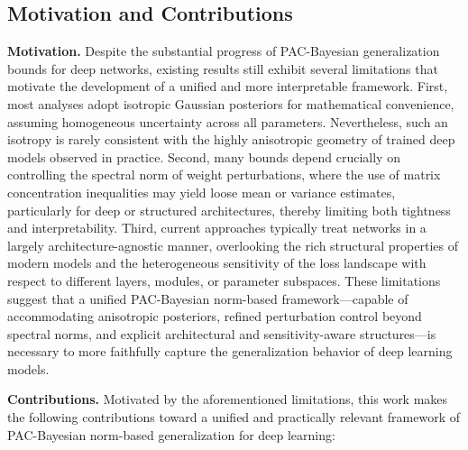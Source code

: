 \documentclass[journal]{IEEEtran} %
\begin{document}
\subsection{Motivation and Contributions}
\textbf{Motivation.}
Despite the substantial progress of PAC-Bayesian generalization bounds for deep networks, existing results still exhibit several limitations that motivate the development of a unified and more interpretable framework. First, most analyses adopt isotropic Gaussian posteriors for mathematical convenience, assuming homogeneous uncertainty across all parameters. Nevertheless, such an isotropy is rarely consistent with the highly anisotropic geometry of trained deep models observed in practice. Second, many bounds depend crucially on controlling the spectral norm of weight perturbations, where the use of matrix concentration inequalities may yield loose mean or variance estimates, particularly for deep or structured architectures, thereby limiting both tightness and interpretability. Third, current approaches typically treat networks in a largely architecture-agnostic manner, overlooking the rich structural properties of modern models and the heterogeneous sensitivity of the loss landscape with respect to different layers, modules, or parameter subspaces. These limitations suggest that a unified PAC-Bayesian norm-based framework—capable of accommodating anisotropic posteriors, refined perturbation control beyond spectral norms, and explicit architectural and sensitivity-aware structures—is necessary to more faithfully capture the generalization behavior of deep learning models.

\textbf{Contributions.} Motivated by the aforementioned limitations, this work makes the following contributions toward a unified and practically relevant framework of PAC-Bayesian norm-based generalization for deep learning:
\end{document}
